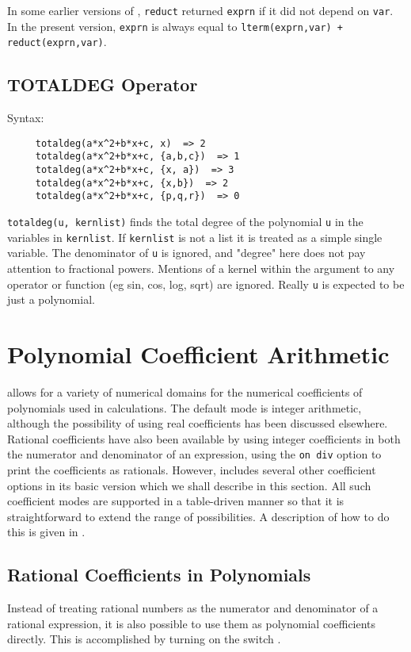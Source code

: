 {\COMPATNOTE} In some earlier versions of \REDUCE, \texttt{reduct} returned
\texttt{exprn} if it did not depend on \texttt{var}.  In the present version,
\texttt{exprn} is always equal to \texttt{lterm(exprn,var) + reduct(exprn,var)}.

\subsection{TOTALDEG Operator}
\hypertarget{operator:TOTALDEG}{}

Syntax:
\begin{verbatim}
     totaldeg(a*x^2+b*x+c, x)  => 2
     totaldeg(a*x^2+b*x+c, {a,b,c})  => 1
     totaldeg(a*x^2+b*x+c, {x, a})  => 3
     totaldeg(a*x^2+b*x+c, {x,b})  => 2
     totaldeg(a*x^2+b*x+c, {p,q,r})  => 0
\end{verbatim}
\texttt{totaldeg(u, kernlist)} finds the total degree of the polynomial \texttt{u} in
the variables in \texttt{kernlist}. If \texttt{kernlist} is not a list it is treated
as a simple single variable.
The denominator of \texttt{u} is ignored, and "degree" here does not pay attention
to fractional powers. Mentions of a kernel within the argument to any
operator or function (eg sin, cos, log, sqrt) are ignored. Really \texttt{u} is
expected to be just a polynomial.

\section{Polynomial Coefficient Arithmetic}
{\REDUCE} allows for a variety of numerical domains for the numerical
coefficients of polynomials used in calculations.  The default mode is
integer arithmetic, although the possibility of using real coefficients
 has been discussed elsewhere.  Rational
coefficients have also been available by using integer coefficients in
both the numerator and denominator of an expression, using the
\texttt{on div} option to print the coefficients as rationals.
However, {\REDUCE} includes several other coefficient options in its basic
version which we shall describe in this section.  All such coefficient
modes are supported in a table-driven manner so that it is
straightforward to extend the range of possibilities.  A description of
how to do this is given in \cite{Bradford:86}.

\subsection{Rational Coefficients in Polynomials}
\hypertarget{switch:RATIONAL}{}
Instead of treating rational numbers as the numerator and denominator of a
rational expression, it is also possible to use them as polynomial
coefficients directly. This is accomplished by turning on the switch
.

